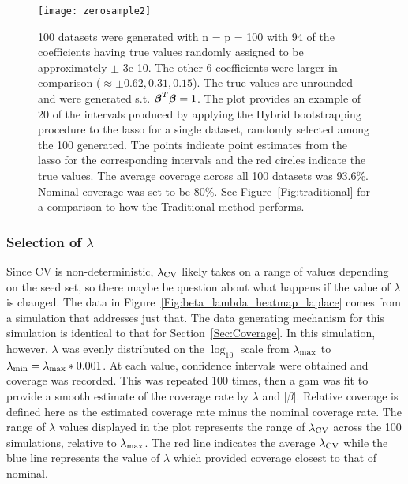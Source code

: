 \begin{figure}[hbtp]
  \begin{center}
  \texttt{[image: zerosample2]}
  \caption{\label{Fig:zerosample2} 100 datasets were generated with n = p = 100 with 94 of the coefficients having true values randomly assigned to be approximately $\pm$ 3e-10. The other 6 coefficients were larger in comparison ($\approx \pm 0.62, 0.31, 0.15$). The true values are unrounded and were generated s.t. $\boldsymbol{\beta}^T\boldsymbol{\beta} = 1$. The plot provides an example of 20 of the intervals produced by applying the Hybrid bootstrapping procedure to the lasso for a single dataset, randomly selected among the 100 generated. The points indicate point estimates from the lasso for the corresponding intervals and the red circles indicate the true values. The average coverage across all 100 datasets was 93.6\%. Nominal coverage was set to be 80\%. See Figure~\ref{Fig:traditional} for a comparison to how the Traditional method performs.}
  \end{center}
\end{figure}


\subsubsection{Selection of \texorpdfstring{$\lambda$}{lambda}} \label{Sec:lambda}

Since CV is non-deterministic, $\lambda_{\textrm{CV}}$ likely takes on a range of values depending on the seed set, so there maybe be question about what happens if the value of $\lambda$ is changed. The data in Figure~\ref{Fig:beta_lambda_heatmap_laplace} comes from a simulation that addresses just that. The data generating mechanism for this simulation is identical to that for Section~\ref{Sec:Coverage}. In this simulation, however, $\lambda$ was evenly distributed on the $\log_{10}$ scale from $\lambda_{\max}$ to $\lambda_{\min} = \lambda_{\max} * 0.001$. At each value, confidence intervals were obtained and coverage was recorded. This was repeated 100 times, then a gam was fit to provide a smooth estimate of the coverage rate by $\lambda$ and $|\beta|$. Relative coverage is defined here as the estimated coverage rate minus the nominal coverage rate. The range of $\lambda$ values displayed in the plot represents the range of $\lambda_{\textrm{CV}}$ across the 100 simulations, relative to $\lambda_{\max}$. The red line indicates the average $\lambda_{\textrm{CV}}$ while the blue line represents the value of $\lambda$ which provided coverage closest to that of nominal.

